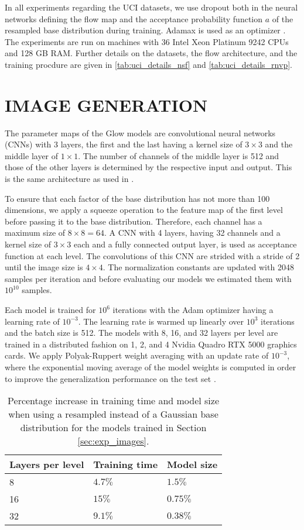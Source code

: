\documentclass[twoside]{article}
\begin{document}
In all experiments regarding the UCI datasets, we use dropout both in the neural networks defining the flow map and the acceptance probability function $a$ of the resampled base distribution during training. Adamax is used as an optimizer \citep{Kingma2015}. The experiments are run on machines with 36 Intel Xeon Platinum 9242 CPUs and 128 GB RAM. Further details on the datasets, the flow architecture, and the training procdure are given in \autoref{tab:uci_details_nsf} and \autoref{tab:uci_details_rnvp}.


\section{IMAGE GENERATION}
\label{sec:app_image_generation}

The parameter maps of the Glow models are convolutional neural networks (CNNs) with 3 layers, the first and the last having a kernel size of $3\times3$ and the middle layer of $1\times1$. The number of channels of the middle layer is 512 and those of the other layers is determined by the respective input and output. This is the same architecture as used in \citep{Kingma2018}.

To ensure that each factor of the base distribution has not more than 100 dimensions, we apply a squeeze operation to the feature map of the first level before passing it to the base distribution. Therefore, each channel has a maximum size of $8\times8 = 64$. A CNN with 4 layers, having 32 channels and a kernel size of $3\times3$ each and a fully connected output layer, is used as acceptance function at each level. The convolutions of this CNN are strided with a stride of 2 until the image size is $4\times4$. The normalization constants are updated with 2048 samples per iteration and before evaluating our models we estimated them with $10^{10}$ samples.

Each model is trained for $10^6$ iterations with the Adam optimizer having a learning rate of $10^{-3}$. The learning rate is warmed up linearly over $10^3$ iterations and the batch size is 512. The models with 8, 16, and 32 layers per level are trained in a distributed fashion on 1, 2, and 4 Nvidia Quadro RTX 5000 graphics cards. We apply Polyak-Ruppert weight averaging \citep{Polyak1990,Ruppert1988} with an update rate of $10^{-3}$, where the exponential moving average of the model weights is computed in order to improve the generalization performance on the test set \citep{Izmailov2018}.

\begin{table}[h]
  \caption{Percentage increase in training time and model size when using a resampled instead of a Gaussian base distribution for the models trained in Section \ref{sec:exp_images}.}
  \label{tab:images_overhead}
  \centering
  \vspace{0.3cm}
  \begin{tabular}{l|ll}
    Layers per level & Training time & Model size\\
    \hline
    8 & $4.7\%$ & $1.5\%$ \\
    16 & $15\%$ & $0.75\%$ \\
    32 & $9.1\%$ & $0.38\%$
  \end{tabular}
\end{table}
\end{document}

